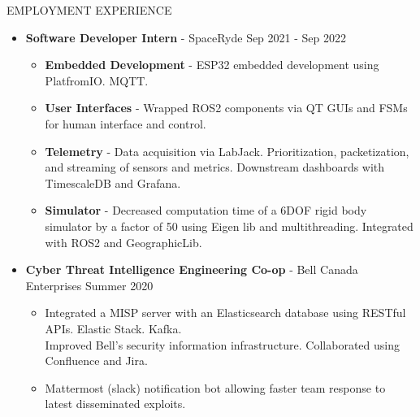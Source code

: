 \documentclass{resume} %
\begin{document}
\begin{rSection}{EMPLOYMENT EXPERIENCE}
    \begin{itemize}
        \item {\bf Software Developer Intern} - SpaceRyde \hfill {Sep 2021 - Sep 2022}
        \begin{itemize}[topsep=-10pt]
            \setlength\itemsep{-0.35em}
            \item[\textbullet] {\bf Embedded Development} - ESP32 embedded development using PlatfromIO. MQTT.
            \item[\textbullet] {\bf User Interfaces} - Wrapped ROS2 components via QT GUIs and FSMs for human interface and control.
            \item[\textbullet] {\bf Telemetry} - Data acquisition via LabJack. Prioritization, packetization, and streaming of sensors and metrics. Downstream dashboards with TimescaleDB and Grafana. 
            \item[\textbullet] {\bf Simulator} - Decreased computation time of a 6DOF rigid body simulator by a factor of 50 using Eigen lib and multithreading.
            Integrated with ROS2 and GeographicLib.
        \end{itemize}
        \item {\bf Cyber Threat Intelligence Engineering Co-op} - Bell Canada Enterprises \hfill {Summer 2020}
        \begin{itemize}[topsep=-10pt]
            \setlength\itemsep{-0.35em}
            \item[\textbullet] Integrated a MISP server with an Elasticsearch database using RESTful APIs. Elastic Stack. Kafka.\\
            Improved Bell's security information infrastructure. Collaborated using Confluence and Jira.
            \item[\textbullet] Mattermost (slack) notification bot allowing faster team response to latest disseminated exploits.
        \end{itemize}
    \end{itemize}
\end{rSection}
\end{document}
